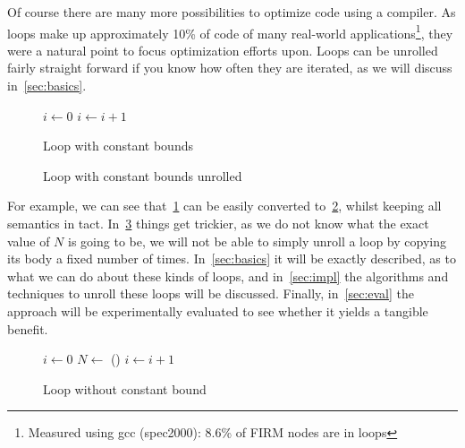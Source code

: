Of course there are many more possibilities to optimize code using a compiler.
As loops make up approximately 10\% of code of many real-world applications\footnote{Measured using gcc (spec2000): 8.6\% of FIRM nodes are in loops}, they were a natural point to focus optimization efforts upon.
Loops can be unrolled fairly straight forward if you know how often they are iterated, as we will discuss in~\cref{sec:basics}.

\begin{figure}[h]
    \label{fig:intro:unroll-simple-before}
    \begin{algorithmic}
        \State $i \gets 0$
            \State {}
            \State $i \gets i + 1$
        \EndWhile
    \end{algorithmic}
    \caption{Loop with constant bounds}
\end{figure}
\begin{figure}[h]
    \begin{algorithmic}
        \State {}
        \State {}
        \State {}
        \State {}
        \State {}
    \end{algorithmic}
    \caption{Loop with constant bounds unrolled}
    \label{fig:intro:unroll-simple-after}
\end{figure}
For example, we can see that~\cref{fig:intro:unroll-simple-before} can be easily converted to~\cref{fig:intro:unroll-simple-after}, whilst keeping all semantics in tact.
In~\cref{fig:intro:unroll-nostatic-bound} things get trickier, as we do not know what the exact value of $N$ is going to be, we will not be able to simply unroll a loop by copying its body a fixed number of times.
In~\cref{sec:basics} it will be exactly described, as to what we can do about these kinds of loops, and in~\cref{sec:impl} the algorithms and techniques to unroll these loops will be discussed.
Finally, in~\cref{sec:eval} the approach will be experimentally evaluated to see whether it yields a tangible benefit.
\begin{figure}[h]
    \begin{algorithmic}
        \State $i \gets 0$
        \State $N \gets$ () 
            \State {}
            \State $i \gets i + 1$
        \EndWhile
    \end{algorithmic}
    \caption{Loop without constant bound}
    \label{fig:intro:unroll-nostatic-bound}
\end{figure}

